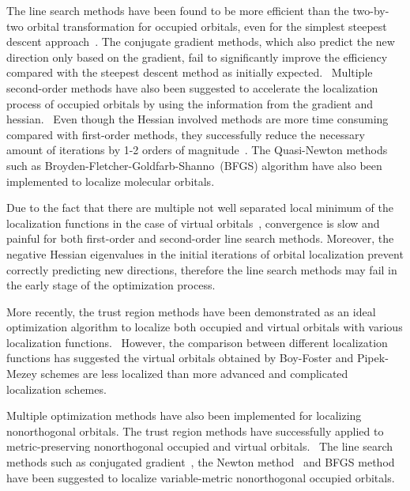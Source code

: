\documentclass[aps,prl,reprint,amsmath,amssymb]{revtex4-1}
\begin{document}
The line search methods have been found to be more efficient than the two-by-two orbital transformation for occupied orbitals, even for the simplest steepest descent approach~\cite{edmiston1965localized}.
The conjugate gradient methods, which also predict the new direction only based on the gradient, fail to significantly improve the efficiency compared with the steepest descent method as initially expected.~\cite{ryback1978application}
Multiple second-order methods have also been suggested to accelerate the localization process of occupied orbitals by using the information from the gradient and hessian.~\cite{leonard1982quadratically, kari1984parametrization}
Even though the Hessian involved methods are more time consuming compared with first-order methods, they successfully reduce the necessary amount of iterations by 1-2 orders of magnitude~\citet{leonard1982quadratically}.
The Quasi-Newton methods such as Broyden-Fletcher-Goldfarb-Shanno~(BFGS) algorithm have also been implemented to localize molecular orbitals.~\cite{kari1984parametrization}

Due to the fact that there are multiple not well separated local minimum of the localization functions in the case of virtual orbitals~\cite{subotnik2005fast}, convergence is slow and painful for both first-order and second-order line search methods.
Moreover, the negative Hessian eigenvalues in the initial iterations of orbital localization prevent correctly predicting new directions, therefore the line search methods may fail in the early stage of the optimization process.

More recently, the trust region methods have been demonstrated as an ideal optimization algorithm to localize both occupied and virtual orbitals with various localization functions.~\cite{jansik2011local, hoyvik2012trust, hoyvik2012orbital,hoyvik2013pipek}
However, the comparison between different localization functions has suggested the virtual orbitals obtained by Boy-Foster and Pipek-Mezey schemes are less localized than more advanced and complicated localization schemes.~\cite{hoyvik2013localized} 

Multiple optimization methods have also been implemented for localizing nonorthogonal orbitals.
The trust region methods have successfully applied to metric-preserving nonorthogonal occupied and virtual orbitals.~\cite{hoyvik2017generalising}
The line search methods such as conjugated gradient~\cite{liu2000nonorthogonal}, the Newton method~\cite{feng2004An_efficient} and BFGS method~\cite{cui2010efficient} have been suggested to localize variable-metric nonorthogonal occupied orbitals.
\end{document}
